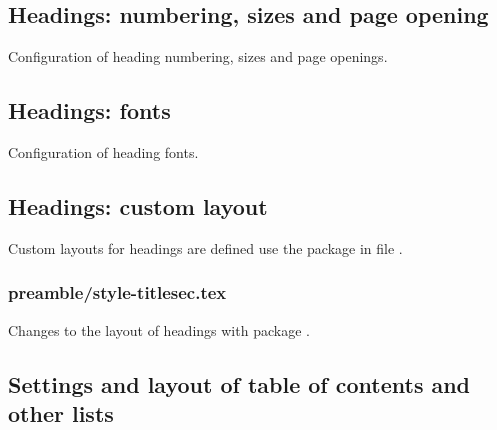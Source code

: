 \subsection{Headings: numbering, sizes and page opening}
\label{sec:style:headings}

Configuration of heading numbering, sizes and page openings.


\subsection{Headings: fonts}
\label{sec:style:headings:fonts}

Configuration of heading fonts.


\subsection{Headings: custom layout}
\label{sec:style:headings:custom}

Custom layouts for headings are defined use the package  in file .


\subsubsection{preamble/style-titlesec.tex}

Changes to the layout of headings with package . 


\subsection{Settings and layout of table of contents and other lists}
\label{sec:style:toc}

